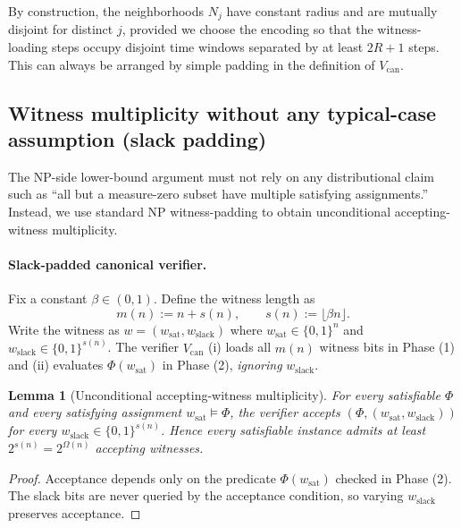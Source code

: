 \documentclass[12pt]{article}
\newtheorem{lemma}[theorem]{Lemma}
\theoremstyle{definition}
\theoremstyle{definition}
\theoremstyle{remark}
\theoremstyle{remark}
\begin{document}
By construction, the neighborhoods $N_j$ have constant radius and are mutually
disjoint for distinct $j$, provided we choose the encoding so that the
witness-loading steps occupy disjoint time windows separated by at least
$2R+1$ steps. This can always be arranged by simple padding in the definition
of $V_{\mathrm{can}}$.

\subsection{Witness multiplicity without any typical-case assumption (slack padding)}
\label{subsec:slack-padding}

The NP-side lower-bound argument must not rely on any distributional claim such as
``all but a measure-zero subset have multiple satisfying assignments.'' Instead, we
use standard NP witness-padding to obtain unconditional accepting-witness multiplicity.

\paragraph{Slack-padded canonical verifier.}
Fix a constant $\beta\in(0,1)$. Define the witness length as
\[
m(n) := n + s(n), \qquad s(n):=\lfloor \beta n \rfloor.
\]
Write the witness as $w=(w_{\mathrm{sat}},w_{\mathrm{slack}})$ where
$w_{\mathrm{sat}}\in\{0,1\}^n$ and $w_{\mathrm{slack}}\in\{0,1\}^{s(n)}$.
The verifier $V_{\mathrm{can}}$ (i) loads all $m(n)$ witness bits in Phase (1) and
(ii) evaluates $\Phi(w_{\mathrm{sat}})$ in Phase (2), \emph{ignoring} $w_{\mathrm{slack}}$.

\begin{lemma}[Unconditional accepting-witness multiplicity]
\label{lem:slack-multiplicity}
For every satisfiable $\Phi$ and every satisfying assignment $w_{\mathrm{sat}}\models\Phi$,
the verifier accepts $(\Phi,(w_{\mathrm{sat}},w_{\mathrm{slack}}))$ for \emph{every}
$w_{\mathrm{slack}}\in\{0,1\}^{s(n)}$.
Hence every satisfiable instance admits at least $2^{s(n)}=2^{\Omega(n)}$ accepting witnesses.
\end{lemma}

\begin{proof}
Acceptance depends only on the predicate $\Phi(w_{\mathrm{sat}})$ checked in Phase (2).
The slack bits are never queried by the acceptance condition, so varying $w_{\mathrm{slack}}$
preserves acceptance.
\end{proof}
\end{document}
